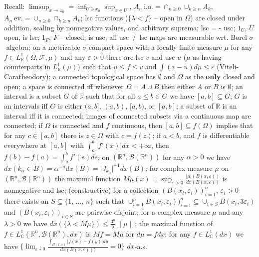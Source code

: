 \documentclass[a4paper]{article}
\newcommand{\Fcal}{\mathcal{F}}
\newcommand{\Bcal}{\mathcal{B}}
\newcommand{\real}{\mathbb{R}}
\newcommand{\cplx}{\mathbb{C}}
\begin{document}
Recall:
$\limsup_{x\to x_0} = \inf_{U\ni x_0} \sup_{x\in U}$,
$A_n~\text{i.o.} = \cap_{n\geq 0} \cup_{k\geq n} A_k$,
$A_n~\text{ev.} = \cup_{n\geq 0} \cap_{k\geq n} A_k$;
%
lsc functions ($\{\lambda < f\}$ -- open in $\Omega$) are closed under addition,
scaling by nonnegative values, and arbitrary suprema;
%
lsc = - usc;
%
$1_U$, $U$ open, is lsc;
%
$1_F$, $F$ -- closed, is usc;
%
all usc~/~lsc maps are measurable wrt. Borel $\sigma$-algebra;
%
on a metrizable $\sigma$-compact space with a locally finite measure $\mu$ for any
$f \in L^1_\real(\Omega, \Fcal, \mu)$ and any $\varepsilon > 0$ there are lsc $v$ and
usc $u$ ($\mu$-as having counterparts in $L^1_\real(\mu)$) such that $u \leq f \leq v$
and $\int (v - u) d\mu \leq \varepsilon$ (Viteli-Caratheodory);
%
a connected topological space has $\emptyset$ and $\Omega$ as the {\bf only} closed
and open;
%
a space is connected iff whenever $\Omega = A \uplus B$ then either $A$ or $B$ is
$\emptyset$;
%
an interval is a subset $G$ of $\real$ such that for all $a \leq b \in G$ we have
$[a, b] \subseteq G$;
%
$G$ is an intervals iff $G$ is either $(a, b]$, $(a, b)$, $[a, b)$, or $[a, b]$;
%
a subset of $\real$ is an interval iff it is connected;
%
images of connected subsets via a continuous map are connected;
%
if $\Omega$ is connected and $f$ continuous, then $[a, b] \subseteq f(\Omega)$ implies
that for any $c \in [a, b]$ there is $z \in \Omega$ with $c = f(z)$;
%
if $a < b$, and $f$ is differentiable everywhere at $[a, b]$ with
$\int_a^b | f'(x)| dx < + \infty$, then $f(b) - f(a) = \int_a^b f'(s) ds$;
%
on $(\real^n, \Bcal(\real^n))$ for any $\alpha > 0$ we have
$dx({k_\alpha \in B})
  = \alpha^{-n} dx(B)
  = \lvert J_{k_\alpha} \rvert^{-1} dx(B)$;
%
for complex measure $\mu$ on $(\real^n, \Bcal(\real^n))$ the maximal function
$M\mu(x) = \sup_{\varepsilon>0}
  \tfrac{|\mu|(B(x,\varepsilon))}
        {dx(B(x,\varepsilon))}$
is nonnegative and lsc;
%
(constructive) for a collection $(B(x_i,\varepsilon_i))_{i=1}^n$, $\varepsilon_i > 0$
there exists an $S \subseteq \{1,\,\ldots,\,n\}$ such that
$\cup_{i=1}^n B(x_i,\varepsilon_i))_{i=1}^n
  \subseteq \cup_{i\in S} B(x_i, 3\varepsilon_i)$
and $(B(x_i,\varepsilon_i))_{i\in S}$ are pairwise disjoint;
%
for a complex measure $\mu$ and any $\lambda > 0$ we have
$dx(\{\lambda < M\mu\}) \leq \tfrac{3^n}{\lambda} \|\mu\|$;
%
the maximal function of $f \in L^1_\cplx(\real^n, \Bcal(\real^n), dx)$ is
$M f = M \mu$ for $d\mu = f dx$;
%
for any $f \in L^1_\cplx(dx)$ we have
$\bigl\{
  \lim_{\varepsilon \downarrow 0}
    \tfrac{\int_{B(x, \varepsilon)} |f(x) - f(y)| dy}
          {dx(B(x, \varepsilon)))}
  = 0\bigr\}$ $dx$-a.s.
\end{document}
